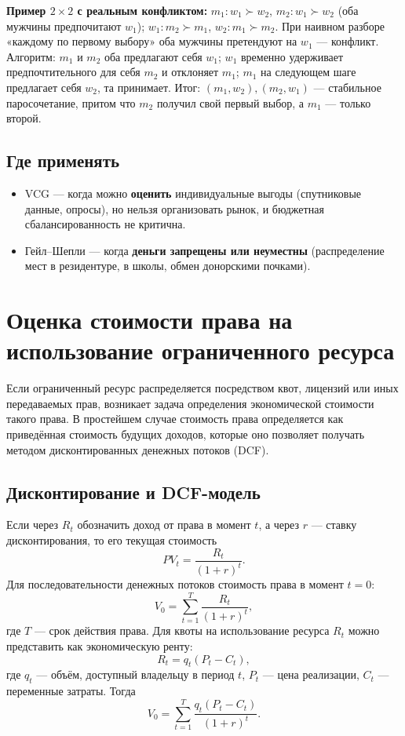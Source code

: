 \documentclass[11pt]{article}
\begin{document}
\textbf{Пример $2\times2$ с реальным конфликтом:} $m_1: w_1 \succ w_2$, $m_2: w_1 \succ w_2$ (оба мужчины предпочитают $w_1$); $w_1: m_2 \succ m_1$, $w_2: m_1 \succ m_2$. При наивном разборе «каждому по первому выбору» оба мужчины претендуют на $w_1$ — конфликт. Алгоритм: $m_1$ и $m_2$ оба предлагают себя $w_1$; $w_1$ временно удерживает предпочтительного для себя $m_2$ и отклоняет $m_1$; $m_1$ на следующем шаге предлагает себя $w_2$, та принимает. Итог: $(m_1,w_2), (m_2,w_1)$ — стабильное паросочетание, притом что $m_2$ получил свой первый выбор, а $m_1$ — только второй.

\subsection{Где применять}
\begin{itemize}
\item VCG — когда можно \textbf{оценить} индивидуальные выгоды (спутниковые данные, опросы), но нельзя организовать рынок, и бюджетная сбалансированность не критична.
\item Гейл--Шепли — когда \textbf{деньги запрещены или неуместны} (распределение мест в резидентуре, в школы, обмен донорскими почками).
\end{itemize}

\section{Оценка стоимости права на использование ограниченного ресурса}

Если ограниченный ресурс распределяется посредством квот, лицензий или иных передаваемых прав, возникает задача определения экономической стоимости такого права. В простейшем случае стоимость права определяется как приведённая стоимость будущих доходов, которые оно позволяет получать методом дисконтированных денежных потоков (DCF).

\subsection{Дисконтирование и DCF-модель}
Если через $R_t$ обозначить доход от права в момент $t$, а через $r$ — ставку дисконтирования, то его текущая стоимость
\[
PV_t = \frac{R_t}{(1+r)^t}.
\]
Для последовательности денежных потоков стоимость права в момент $t=0$:
\[
V_0 = \sum_{t=1}^{T} \frac{R_t}{(1+r)^t},
\]
где $T$ — срок действия права. Для квоты на использование ресурса $R_t$ можно представить как экономическую ренту:
\[
R_t = q_t(P_t-C_t),
\]
где $q_t$ — объём, доступный владельцу в период $t$, $P_t$ — цена реализации, $C_t$ — переменные затраты. Тогда
\[
V_0 = \sum_{t=1}^{T} \frac{q_t(P_t-C_t)}{(1+r)^t}.
\]
\end{document}

